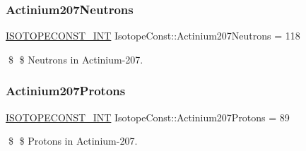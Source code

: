 \subsubsection{\texorpdfstring{Actinium207\+Neutrons}{Actinium207Neutrons}}
{\footnotesize\ttfamily \mbox{\hyperlink{group___isotope_const-_macros_ga5f18360b3e99483a35c32d789e62621c}{I\+S\+O\+T\+O\+P\+E\+C\+O\+N\+S\+T\+\_\+\+I\+NT}} Isotope\+Const\+::\+Actinium207\+Neutrons = 118}

\$ \$ Neutrons in Actinium-\/207. \mbox{\label{group___isotope_const-_actinium-_ac207_gaeae56f04fbfb715110cfcf65a211f2d1}} 
\subsubsection{\texorpdfstring{Actinium207\+Protons}{Actinium207Protons}}
{\footnotesize\ttfamily \mbox{\hyperlink{group___isotope_const-_macros_ga5f18360b3e99483a35c32d789e62621c}{I\+S\+O\+T\+O\+P\+E\+C\+O\+N\+S\+T\+\_\+\+I\+NT}} Isotope\+Const\+::\+Actinium207\+Protons = 89}

\$ \$ Protons in Actinium-\/207. 